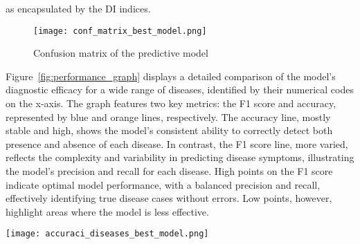 as encapsulated by the DI indices.
\begin{figure}[H]
	\centering
	\texttt{[image: conf\_matrix\_best\_model.png]}
	\caption{Confusion matrix of the predictive model}\label{fig:conf_matrix}
\end{figure}
\noindent
Figure~\ref{fig:performance_graph} displays a detailed comparison of the model's diagnostic efficacy for a wide range of diseases,
identified by their numerical codes on the x-axis.
The graph features two key metrics: the F1 score and accuracy, represented by blue and orange lines, respectively.
The accuracy line, mostly stable and high, shows the model's consistent ability to correctly detect both presence and absence of each disease.
In contrast, the F1 score line, more varied, reflects the complexity and variability in predicting disease symptoms,
illustrating the model's precision and recall for each disease. High points on the F1 score indicate optimal model performance,
with a balanced precision and recall, effectively identifying true disease cases without errors.
Low points, however, highlight areas where the model is less effective.
\begin{figure*}[htbp]
	\centering
	\texttt{[image: accuraci\_diseases\_best\_model.png]}
	\caption{A comparison of the F1 score and accuracy for each disease predicted by the model.}
	\label{fig:performance_graph}
\end{figure*}
